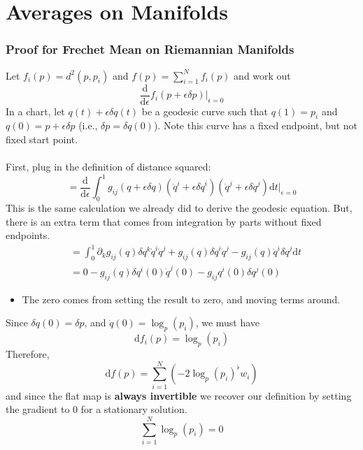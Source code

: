 \documentclass[10pt]{article}
\newcommand{\dd}{\text{d}}
\begin{document}
\section*{Averages on Manifolds}
\subsubsection*{Proof for Frechet Mean on Riemannian Manifolds}
Let $f_i(p) = d^2(p, p_i)$ and $f(p) = \sum_{i = 1}^N f_i(p)$ and work out
\[\frac{\dd}{\dd \epsilon} f_i(p + \epsilon \delta p) \bigg|_{\epsilon = 0}\]
In a chart, let $q(t) + \epsilon \delta q(t)$ be a geodesic curve such that $q(1) = p_i$ and $q(0) = p + \epsilon \delta p$ (i.e., $\delta p = \delta q(0)$).  Note this curve has a fixed endpoint, but not fixed start point.\\\\
First, plug in the definition of distance squared:
\[= \frac{\dd}{\dd \epsilon} \int_0^1 g_{ij} (q + \epsilon \delta q)(\dot{q}^i + \epsilon \delta \dot{q}^i)(\dot{q}^j + \epsilon \delta \dot{q}^j) \dd t \bigg|_{\epsilon = 0}\]
This is the same calculation we already did to derive the geodesic equation.  But, there is an extra term that comes from integration by parts without fixed endpoints.
\begin{align*}
    &= \int_0^1 \partial_k g_{ij}(q) \delta q^k \dot{q}^i \dot{q}^j + g_{ij}(q)\delta \dot{q}^i \dot{q}^j - g_{ij} (q)\dot{q}^i \delta \dot{q}^j \dd t\\
    &= 0 - g_{ij}(q) \delta q^i(0) \dot{q}^j(0) - g_{ij} q^i(0) \delta q^j (0)
\end{align*}
\begin{itemize}
	\item The zero comes from setting the result to zero, and moving terms around.
\end{itemize}
Since $\delta q(0) = \delta p$, and $\dot{q}(0) = \log_p(p_i)$, we must have
\[\dd f_i(p) = \log_p(p_i)\]
Therefore,
\[\dd f(p) = \sum_{i = 1}^N (-2 \log_p (p_i)^\flat w_i)\]
and since the flat map is \textbf{always invertible} we recover our definition by setting the gradient to 0 for a stationary solution.
\[\sum_{i = 1}^N \log_p (p_i) = 0\]
\end{document}
